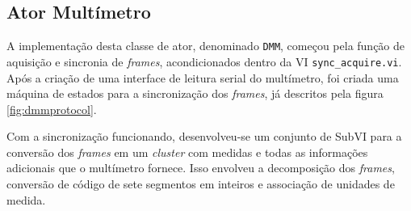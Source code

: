             
            
            
            
        
        \subsection{Ator Multímetro}
            \label{dmmmodel}
            
            
            
            

            A implementação desta classe de ator, denominado \texttt{DMM}, começou pela função de aquisição e sincronia de \textit{frames}, acondicionados dentro da VI \texttt{sync\_acquire.vi}. Após a criação de uma interface de leitura serial do multímetro, foi criada uma máquina de estados para a sincronização dos \textit{frames}, já descritos pela figura \ref{fig:dmmprotocol}.
            
            
            Com a sincronização funcionando, desenvolveu-se um conjunto de SubVI para a conversão dos \textit{frames} em um \textit{cluster} com medidas e todas as informações adicionais que o multímetro fornece. Isso envolveu a decomposição dos \textit{frames}, conversão de código de sete segmentos em inteiros e associação de unidades de medida. 
            
